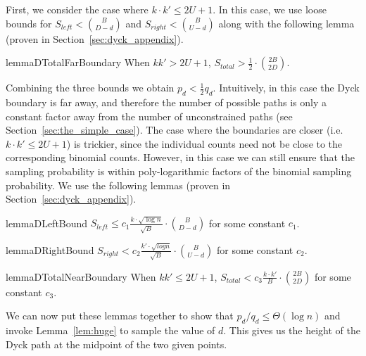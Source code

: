 First, we consider the case where $k\cdot k'\le 2U+1$.
In this case, we use loose bounds for $S_{left} < \binom{B}{D-d}$ and $S_{right} < \binom{B}{U-d}$
along with the following lemma (proven in Section~\ref{sec:dyck_appendix}).
\begin{restatable}{lemma}{DTotalFarBoundary}
\label{lem:DTotalFarBoundary}
When $kk' > 2U + 1$, $S_{total} > \frac 12\cdot \binom{2B}{2D}$.
\end{restatable}

Combining the three bounds we obtain $p_d < \frac 12 q_d$.
Intuitively, in this case the Dyck boundary is far away, and therefore the number of possible paths
is only a constant factor away from the number of unconstrained paths (see Section~\ref{sec:the_simple_case}).
The case where the boundaries are closer (i.e. $k\cdot k' \le 2U+1$) is trickier,
since the individual counts need not be close to the corresponding binomial counts.
However, in this case we can still ensure that the sampling probability is within poly-logarithmic factors of the binomial sampling probability.
We use the following lemmas (proven in Section~\ref{sec:dyck_appendix}).

\begin{restatable}{lemma}{DLeftBound}
\label{lem:DLeftBound}
$S_{left} \le c_1 \frac{ k\cdot\sqrt{\log n}}{\sqrt{B}}\cdot{{B}\choose{D-d}}$ for some constant $c_1$.
\end{restatable}

\begin{restatable}{lemma}{DRightBound}
\label{lem:DRightBound}
$S_{right} < c_2 \frac{k'\cdot \sqrt{log n}}{\sqrt{B}}\cdot{{B}\choose{U-d}}$ for some constant $c_2$.
\end{restatable}

\begin{restatable}{lemma}{DTotalNearBoundary}
\label{lem:DTotalNearBoundary}
When $kk' \le 2U + 1$, $S_{total} < c_3 \frac{k\cdot k'}{B}\cdot{{2B}\choose{2D}}$ for some constant $c_3$.
\end{restatable}

We can now put these lemmas together to show that $p_d/q_d \le \Theta(\log n)$ and invoke Lemma~\ref{lem:huge} to sample the value of $d$.
This gives us the height of the Dyck path at the midpoint of the two given points.

